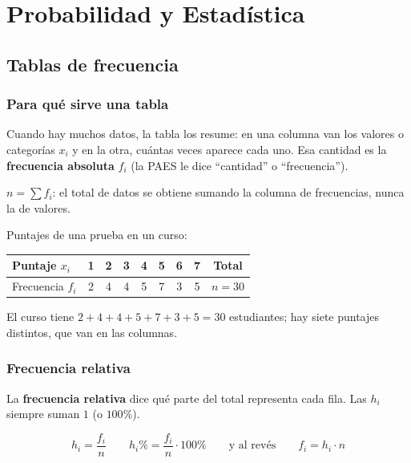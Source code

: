 \chapter{Probabilidad y Estadística}
\newcommand{\pyecaja}[6]{%
  \draw[thick,gris] (#2,#1) -- (#3,#1) (#5,#1) -- (#6,#1);
  \draw[thick,gris] (#2,#1-0.18) -- (#2,#1+0.18) (#6,#1-0.18) -- (#6,#1+0.18);
  \draw[thick,nar,fill=narc!35] (#3,#1-0.32) rectangle (#5,#1+0.32);
  \draw[very thick,nard] (#4,#1-0.32) -- (#4,#1+0.32);}

\section{Tablas de frecuencia}

\subsection{Para qué sirve una tabla}
Cuando hay muchos datos, la tabla los resume: en una columna van los valores o categorías $x_i$ y en la otra, cuántas veces aparece cada uno. Esa cantidad es la \textbf{frecuencia absoluta} $f_i$ (la PAES le dice ``cantidad'' o ``frecuencia'').

\begin{clave}[El total] $n = \sum f_i$: el total de datos se obtiene sumando la columna de frecuencias, nunca la de valores.\end{clave}

\begin{ejemplo}
Puntajes de una prueba en un curso:\par\smallskip
\centering\begin{tabular}{@{}l*{7}{c}c@{}}\toprule
Puntaje $x_i$ & 1 & 2 & 3 & 4 & 5 & 6 & 7 & Total\\\midrule
Frecuencia $f_i$ & 2 & 4 & 4 & 5 & 7 & 3 & 5 & $n = 30$\\\bottomrule
\end{tabular}\par\smallskip
\raggedright El curso tiene $2+4+4+5+7+3+5 = 30$ estudiantes; hay siete puntajes distintos, que van en las columnas.
\end{ejemplo}

\subsection{Frecuencia relativa}
La \textbf{frecuencia relativa} dice qué parte del total representa cada fila. Las $h_i$ siempre suman $1$ (o $100\%$).
\begin{clave}[Relativa] \[ h_i = \frac{f_i}{n} \qquad h_i\% = \frac{f_i}{n}\cdot 100\% \qquad\text{y al revés}\qquad f_i = h_i\cdot n \]\end{clave}

